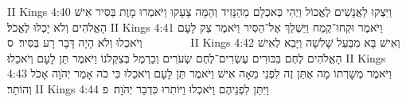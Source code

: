 II Kings 4:40	וַיִּצְקוּ לַאֲנָשִׁים לֶאֱכוֹל וַיְהִי כְּאכְלָם מֵהַנָּזִיד וְהֵמָּה צָעָקוּ וַיֹּאמְרוּ מָוֶת בַּסִּיר אִישׁ הָאֱלֹהִים וְלֹא יָכְלוּ לֶאֱכֹל׃
II Kings 4:41	וַיֹּאמֶר וּקְחוּ־קֶמַח וַיַּשְׁלֵךְ אֶל־הַסִּיר וַיֹּאמֶר צַק לָעָם וְיֹאכֵלוּ וְלֹא הָיָה דָּבָר רָע בַּסִּיר׃ {ס}        
II Kings 4:42	וְאִישׁ בָּא מִבַּעַל שָׁלִשָׁה וַיָּבֵא לְאִישׁ הָאֱלֹהִים לֶחֶם בִּכּוּרִים עֶשְׂרִים־לֶחֶם שְׂעֹרִים וְכַרְמֶל בְּצִקְלֹנוֹ וַיֹּאמֶר תֵּן לָעָם וְיֹאכֵלוּ׃
II Kings 4:43	וַיֹּאמֶר מְשָׁרְתוֹ מָה אֶתֵּן זֶה לִפְנֵי מֵאָה אִישׁ וַיֹּאמֶר תֵּן לָעָם וְיֹאכֵלוּ כִּי כֹה אָמַר יְהֹוָה אָכֹל וְהוֹתֵר׃
II Kings 4:44	וַיִּתֵּן לִפְנֵיהֶם וַיֹּאכְלוּ וַיּוֹתִרוּ כִּדְבַר יְהֹוָה׃ {פ}
